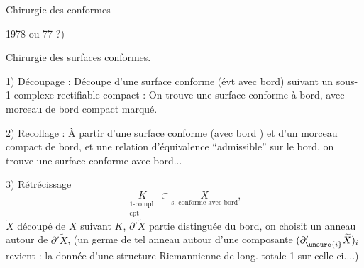 
Chirurgie des  conformes ---

1978 ou 77 ?)


Chirurgie des surfaces conformes.

1) \uline{Découpage} : Découpe d'une surface conforme  (évt avec bord) suivant un sous-1-complexe rectifiable compact : On trouve une surface conforme à  bord, avec morceau  de bord compact marqué.

2) \uline{Recollage} : À partir d'une surface conforme (avec bord ) et d'un morceau compact de bord, et une relation d'équivalence ``admissible''  sur le bord,  on trouve une surface conforme avec bord...

3) \uline{Rétrécissage}
\[
\underset{\substack{\text{1-compl.}\\\text{cpt}}}{K}\subset
\underset{\text{s. conforme avec bord}}{X},
\]
$\widetilde X$ découpé de $X$ suivant $K$, $\partial'\widetilde X$ partie distinguée du bord, on choisit un anneau autour de $\partial'\widetilde X$,  (un germe de tel anneau autour d'une composante $(\partial'_{\unsure{i}}\widetilde X)_i$ revient : la donnée d'une structure Riemannienne   de long. totale 1 sur celle-ci....)

